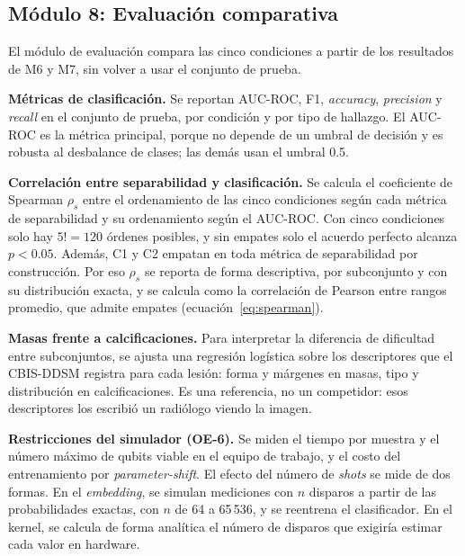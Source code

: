 
\subsection{Módulo 8: Evaluación comparativa}
\label{sec:modulo8}

El módulo de evaluación compara las cinco condiciones a partir de los resultados de M6 y M7, sin
volver a usar el conjunto de prueba.

\textbf{Métricas de clasificación.} Se reportan AUC-ROC, F1, \textit{accuracy}, \textit{precision}
y \textit{recall} en el conjunto de prueba, por condición y por tipo de hallazgo. El AUC-ROC es la
métrica principal, porque no depende de un umbral de decisión y es robusta al desbalance de clases;
las demás usan el umbral 0.5.

\textbf{Correlación entre separabilidad y clasificación.} Se calcula el coeficiente de Spearman
$\rho_s$ entre el ordenamiento de las cinco condiciones según cada métrica de separabilidad y su
ordenamiento según el AUC-ROC. Con cinco condiciones solo hay $5! = 120$ órdenes posibles, y sin
empates solo el acuerdo perfecto alcanza $p < 0.05$. Además, C1 y C2 empatan en toda métrica de
separabilidad por construcción. Por eso $\rho_s$ se reporta de forma descriptiva, por subconjunto y
con su distribución exacta, y se calcula como la correlación de Pearson entre rangos promedio, que
admite empates (ecuación~\eqref{eq:spearman}).

\textbf{Masas frente a calcificaciones.} Para interpretar la diferencia de dificultad entre
subconjuntos, se ajusta una regresión logística sobre los descriptores que el CBIS-DDSM registra
para cada lesión: forma y márgenes en masas, tipo y distribución en calcificaciones. Es una
referencia, no un competidor: esos descriptores los escribió un radiólogo viendo la imagen.

\textbf{Restricciones del simulador (OE-6).} Se miden el tiempo por muestra y el número máximo de
qubits viable en el equipo de trabajo, y el costo del entrenamiento por \textit{parameter-shift}. El
efecto del número de \textit{shots} se mide de dos formas. En el \textit{embedding}, se simulan
mediciones con $n$ disparos a partir de las probabilidades exactas, con $n$ de 64 a 65\,536, y se
reentrena el clasificador. En el kernel, se calcula de forma analítica el número de disparos que
exigiría estimar cada valor en hardware.
